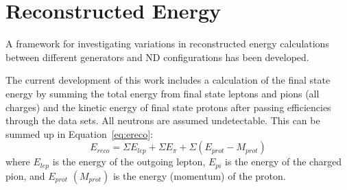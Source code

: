 \documentclass[12pt]{article}
\begin{document}

\section{Reconstructed Energy}\label{sec:Reco}


A framework for investigating variations in reconstructed energy calculations between different generators and ND configurations has been developed. %

The current development of this work includes a calculation of the final state energy by summing the total energy from final state leptons and pions (all charges) and the kinetic energy of final state protons after passing efficiencies through the data sets. All neutrons are assumed undetectable. 
This can be summed up in Equation~\ref{eq:ereco}:
\begin{equation}
E_{reco} = \Sigma {E_{lep}} + \Sigma E_{\pi} + \Sigma (E_{prot} - M_{prot})
\label{eq:ereco}
\end{equation}
where $E_{lep}$ is the energy of the outgoing lepton, $E_{pi}$ is the energy of the charged pion, and $E_{prot}$ $(M_{prot})$ is the energy (momentum) of the proton.

\end{document}

